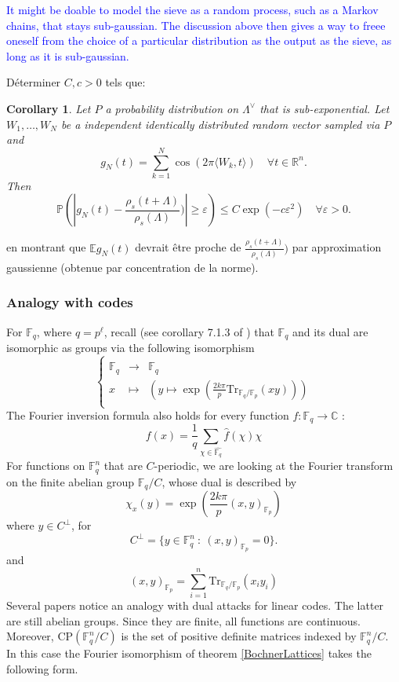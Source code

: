 \documentclass{article}
\newtheorem{corollary}{Corollary}[theorem]
\begin{document}
\textcolor{blue}{It might be doable to model the sieve as a random process, such as a Markov chains, that stays sub-gaussian. The discussion above then gives a way to freee oneself from the choice of a particular distribution as the output as the sieve, as long as it is sub-gaussian.}

Déterminer $C,c> 0$ tels que:
\begin{corollary}
Let $P$ a probability distribution on $\Lambda^\vee$ that is sub-exponential. Let $W_1,\ldots , W_N$ be a independent identically distributed random vector sampled via $P$ and 
\[g_N(t) = \sum_{k=1}^N\cos(2\pi \langle W_k,t\rangle )\quad\forall t\in\mathbb R^n.\] 
Then 
\[\mathbb P( |g_N(t) - \frac{\rho_s(t+\Lambda)}{\rho_s(\Lambda)}) |\geq \varepsilon ) \leq  C \exp( - c\varepsilon^2) \quad \forall \varepsilon >0.\]
\end{corollary}
en montrant que $\mathbb Eg_N(t) $ devrait être proche de $\frac{\rho_s(t+\Lambda)}{\rho_s(\Lambda)})$ par approximation gaussienne (obtenue par concentration de la norme).
\subsubsection{Analogy with codes}

For $\mathbb F_q$, where $q = p^\ell$, recall (see corollary 7.1.3 of \cite{scarabotti2018discrete}) that $\mathbb F_q$ and its dual are isomorphic as groups via the following isomorphism 
\[\left\{ \begin{array}{rcl}
\mathbb F_q 	& \rightarrow 	& \hat {\mathbb F_q} \\
x	& \mapsto 	& \left( y\mapsto \exp (\frac{2k\pi }{p}\text{Tr}_{\mathbb F_q / \mathbb F_p}(xy)) \right)\\
\end{array}\right.\]
The Fourier inversion formula also holds for every function $f : \mathbb F_q \rightarrow \mathbb C$ :
\[f(x) = \frac{1}{q} \sum_{\chi \in \hat{\mathbb F_q}} \hat f(\chi) \chi \]
For functions on $\mathbb F_q^n$ that are $C$-periodic, we are looking at the Fourier transform on the finite abelian group $\mathbb F_q / C$, whose dual is described by
\[ \chi_x(y) = \exp (\frac{2k\pi }{p}(x,y)_{\mathbb F_p} )\]
where $y \in C^\perp$, for 
\[C^{\perp} = \{y\in \mathbb F_q^n \ : \ (x,y)_{\mathbb F_p}= 0   \}.\]
and 
\[(x,y)_{\mathbb F_p} = \sum_{i=1}^n \text{Tr}_{\mathbb F_q / \mathbb F_p}(x_iy_i) \]
Several papers notice an analogy with dual attacks for linear codes. The latter are still abelian groups. Since they are finite, all functions are continuous. Moreover, $\text{CP}(\mathbb F_q^n / C)$ is the set of positive definite matrices indexed by $\mathbb F_q^n / C$. In this case the Fourier isomorphism of theorem \ref{BochnerLattices} takes the following form.
\end{document}
